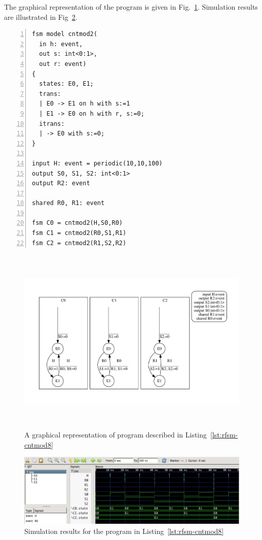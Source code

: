 \medskip
The graphical representation of the program is given in Fig.~\ref{fig:rfsm-cntmod8-top}. Simulation
results are illustrated in Fig~\ref{fig:rfsm-cntmod8-vcd}. 

\begin{lstlisting}[language=Rfsm,frame=single,numbers=left,caption=A multi-model RFSM
  program,label={lst:rfsm-cntmod8},float]
fsm model cntmod2(
  in h: event,
  out s: int<0:1>,
  out r: event)
{
  states: E0, E1;
  trans:
  | E0 -> E1 on h with s:=1
  | E1 -> E0 on h with r, s:=0;
  itrans:
  | -> E0 with s:=0;
}

input H: event = periodic(10,10,100)
output S0, S1, S2: int<0:1>
output R2: event

shared R0, R1: event

fsm C0 = cntmod2(H,S0,R0) 
fsm C1 = cntmod2(R0,S1,R1) 
fsm C2 = cntmod2(R1,S2,R2) 
\end{lstlisting}

\begin{figure}[!h]
   \includegraphics[height=9cm]{figs/ctrmod8-top}
   \centering
  \caption{A graphical representation of program described in Listing~\ref{lst:rfsm-cntmod8}}
  \label{fig:rfsm-cntmod8-top}
\end{figure}

\clearpage
\begin{figure}[!h]
   \includegraphics[width=\textwidth]{figs/ctrmod8-chrono}
   \centering
  \caption{Simulation results for the program in Listing~\ref{lst:rfsm-cntmod8}}
  \label{fig:rfsm-cntmod8-vcd}
\end{figure}

